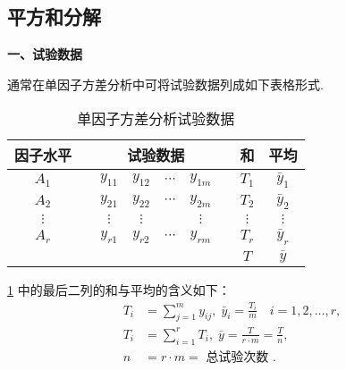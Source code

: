 \subsection{平方和分解}\label{ssec:8.1.3}
\textbf{一、试验数据}

通常在单因子方差分析中可将试验数据列成如下表格形式. 

\begin{table}[htbp]
  \centering
  \caption{单因子方差分析试验数据}
    \begin{tabular}{ccccccccc}
    \toprule
    因子水平  &       & \multicolumn{4}{c}{试验数据}      &       & 和     & 平均 \\
    \midrule
    $A_1$    &       & $y_{11}$   & $y_{12}$   & $\cdots$ & $y_{1m}$   &       & $T_1$    & $\bar{y}_{1}$ \\
    $A_2$    &       & $y_{21}$   & $y_{22}$   & $\cdots$  & $y_{2m}$   &       & $T_2$    & $\bar{y}_{2}$ \\
    $\vdots$ &       & $\vdots$    & $\vdots$   &       &   $\vdots$  &       &  $\vdots$   & $\vdots$ \\
    $A_r$    &       & $y_{r1}$   & $y_{r2}$   & $\cdots$   & $y_{rm}$   &       & $T_r$    & $\bar{y}_{r}$ \\
    \midrule
          &       &       &       &       &       &       & $T$     & $\bar{y}$ \\
    \bottomrule
    \end{tabular}%
  \label{tab:8.1.2}%
\end{table}%
\ref{tab:8.1.2} 中的最后二列的和与平均的含义如下：
\begin{align*}
  T_i &= \sum_{j=1}^{m} y_{ij},\; \bar{y}_i = \frac{T_i}{m} \quad i =1,2,\ldots,r,\\
  T_i & = \sum_{i=1}^{r} T_{i},\; \bar{y} = \frac{T}{r \cdot m} = \frac{T}{n},\\
  n & = r \cdot m = \text{ 总试验次数 }.
\end{align*}

